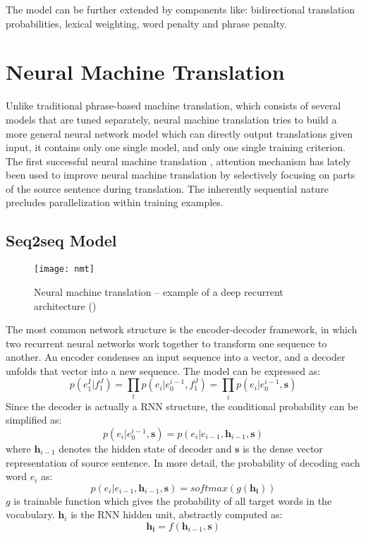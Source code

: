 The model can be further extended by components like: bidirectional translation probabilities, lexical weighting, word penalty and phrase penalty. 


\section{Neural Machine Translation}
Unlike traditional phrase-based machine translation, which consists of several models that are tuned separately, neural machine translation tries to build a more general neural network model which can directly output translations given input, it contains only one single model, and only one single training criterion. \\
The first successful neural machine translation , attention mechanism has lately been used to improve neural machine translation by selectively focusing on parts of the source sentence during translation. The inherently sequential nature precludes parallelization within training examples.



\subsection{Seq2seq Model}
\begin{figure}[t]
	\texttt{[image: nmt]}
	\caption{ Neural machine translation – example of a deep recurrent architecture (\cite{luong2015effective})}
	\centering
\end{figure}

The most common network structure is the encoder-decoder framework, in which two recurrent neural networks work together to transform one sequence to another. An encoder condenses an input sequence into a vector, and a decoder unfolds that vector into a new sequence. The model can be expressed as:
\[ p(e_1^I | f_1^J) = \prod_{t} p(e_i|e_0^{i-1}, f_1^J) = \prod_{i} {p(e_i|e_0^{i-1},  {\bm{s}})} \] 
Since the decoder is actually a RNN structure, the conditional probability can be simplified as:
\[ p(e_i|e_0^{i-1}, \bm{s}) = p(e_i| e_{i-1}, \bm{h}_{i-1}, \bm{s}) \]
where $\bm{h}_{i-1}$ denotes the hidden state of decoder and $\bm{s}$ is the dense vector representation of source sentence.
In more detail, the probability of decoding each word $e_i$ as:
\[ p(e_i| e_{i-1}, \bm{h}_{i-1}, {\bm{s}}) = softmax(g(\bm{h_i}))\]
$g$ is trainable function which gives the probability of all target words in the vocabulary. $\bm{h}_i$ is the RNN hidden unit, abstractly computed as:
\[ \bm{h_i} = f(\bm{h}_{i-1}, \bm{s})\]

